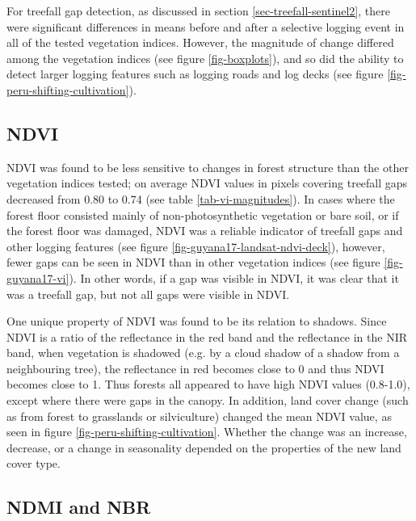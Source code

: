 \documentclass[a4paper,12pt]{scrbook}
\begin{document}
For treefall gap detection, as discussed in section \ref{sec-treefall-sentinel2}, there were significant differences in means before and after a selective logging event in all of the tested vegetation indices. However, the magnitude of change differed among the vegetation indices (see figure \ref{fig-boxplots}), and so did the ability to detect larger logging features such as logging roads and log decks (see figure \ref{fig-peru-shifting-cultivation}).

\subsection{NDVI}

\ac{NDVI} was found to be less sensitive to changes in forest structure than the other vegetation indices tested; on average NDVI values in pixels covering treefall gaps decreased from 0.80 to 0.74 (see table \ref{tab-vi-magnitudes}). In cases where the forest floor consisted mainly of non-photosynthetic vegetation or bare soil, or if the forest floor was damaged, \ac{NDVI} was a reliable indicator of treefall gaps and other logging features (see figure \ref{fig-guyana17-landsat-ndvi-deck}), however, fewer gaps can be seen in \ac{NDVI} than in other vegetation indices (see figure \ref{fig-guyana17-vi}). In other words, if a gap was visible in \ac{NDVI}, it was clear that it was a treefall gap, but not all gaps were visible in \ac{NDVI}.

One unique property of \ac{NDVI} was found to be its relation to shadows. Since \ac{NDVI} is a ratio of the reflectance in the red band and the reflectance in the \ac{NIR} band, when vegetation is shadowed (e.g. by a cloud shadow of a shadow from a neighbouring tree), the reflectance in red becomes close to 0 and thus \ac{NDVI} becomes close to 1. Thus forests all appeared to have high \ac{NDVI} values (0.8-1.0), except where there were gaps in the canopy. In addition, land cover change (such as from forest to grasslands or silviculture) changed the mean \ac{NDVI} value, as seen in figure \ref{fig-peru-shifting-cultivation}. Whether the change was an increase, decrease, or a change in seasonality depended on the properties of the new land cover type.

\subsection{NDMI and NBR}
\end{document}
